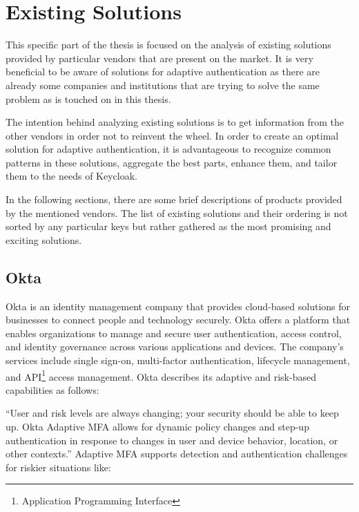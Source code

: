 \chapter{Existing Solutions}

This specific part of the thesis is focused on the analysis of existing solutions provided by particular vendors that are present on the market.
It is very beneficial to be aware of solutions for adaptive authentication as there are already some companies and institutions that are trying to solve the same problem as is touched on in this thesis.

The intention behind analyzing existing solutions is to get information from the other vendors in order not to reinvent the wheel.
In order to create an optimal solution for adaptive authentication, it is advantageous to recognize common patterns in these solutions, aggregate the best parts, enhance them, and tailor them to the needs of Keycloak. 

In the following sections, there are some brief descriptions of products provided by the mentioned vendors.
The list of existing solutions and their ordering is not sorted by any particular keys but rather gathered as the most promising and exciting solutions.

\newpage
\section{Okta}

Okta is an identity management company that provides cloud-based solutions for businesses to connect people and technology securely.
Okta offers a platform that enables organizations to manage and secure user authentication, access control, and identity governance across various applications and devices.
The company's services include single sign-on, multi-factor authentication, lifecycle management, and API\footnote{Application Programming Interface} access management.
Okta describes its adaptive and risk-based capabilities as follows:

``User and risk levels are always changing; your security should be able to keep up.
Okta Adaptive MFA allows for dynamic policy changes and step-up authentication in response to changes in user and device behavior, location, or other contexts.''\cite{existing-okta}
\newline
\newline
Adaptive MFA supports detection and authentication challenges for riskier situations like:

